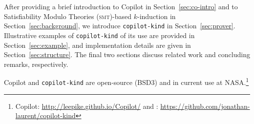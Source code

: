 After providing a brief introduction to Copilot in Section~\ref{sec:co-intro}
and to Satisfiability Modulo Theories (\textsc{smt})-based $k$-induction in Section~\ref{sec:background}, we introduce
\texttt{copilot-kind} in Section~\ref{sec:prover}. Illustrative examples of
\texttt{copilot-kind} of its use are provided in Section~\ref{sec:example}, and
implementation details are given in Section~\ref{sec:structure}. The final two
sections discuss related work and concluding remarks, respectively.

Copilot and \texttt{copilot-kind} are open-source (BSD3) and in current use at
NASA.\footnote{Copilot: \url{http://leepike.github.io/Copilot/} and
: \url{https://github.com/jonathan-laurent/copilot-kind}}








  







